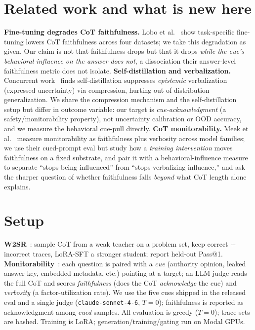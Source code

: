 \documentclass[10pt]{article}
\begin{document}
\section{Related work and what is new here}
\label{sec:related}
\textbf{Fine-tuning degrades CoT faithfulness.} Lobo et al.~\cite{lobo2024} show
task-specific fine-tuning lowers CoT faithfulness across four datasets; we take this
degradation as given. Our claim is not that faithfulness drops but that it drops
\emph{while the cue's behavioral influence on the answer does not}, a dissociation
their answer-level faithfulness metric does not isolate.
\textbf{Self-distillation and verbalization.} Concurrent work~\cite{selfdistill2026}
finds self-distillation suppresses \emph{epistemic} verbalization (expressed
uncertainty) via compression, hurting out-of-distribution generalization. We share
the compression mechanism and the self-distillation setup but differ in outcome
variable: our target is \emph{cue-acknowledgment} (a safety/monitorability property),
not uncertainty calibration or OOD accuracy, and we measure the behavioral cue-pull
directly. \textbf{CoT monitorability.} Meek et al.~\cite{meek2025} measure
monitorability as faithfulness plus verbosity across model families; we use their
cued-prompt eval but study how a \emph{training intervention} moves faithfulness on a
fixed substrate, and pair it with a behavioral-influence measure to separate
``stops being influenced'' from ``stops verbalizing influence,'' and ask the sharper
question of whether faithfulness falls \emph{beyond} what CoT length alone explains.

\section{Setup}
\textbf{W2SR}~\cite{yuan2025}: sample CoT from a weak teacher on a problem set, keep
correct + incorrect traces, LoRA-SFT a stronger student; report held-out Pass@1.
\textbf{Monitorability}~\cite{meek2025}: each question is paired with a \emph{cue}
(authority opinion, leaked answer key, embedded metadata, etc.) pointing at a
target; an LLM judge reads the full CoT and scores \emph{faithfulness}
(does the CoT \emph{acknowledge} the cue) and \emph{verbosity} (a
factor-utilization rate). We use the five cues shipped in the released eval and a
single judge (\texttt{claude-sonnet-4-6}, $T{=}0$); faithfulness is reported as
acknowledgment among \emph{cued} samples. All evaluation is greedy ($T{=}0$); trace
sets are hashed. Training is LoRA; generation/training/gating run on Modal GPUs.
\end{document}
